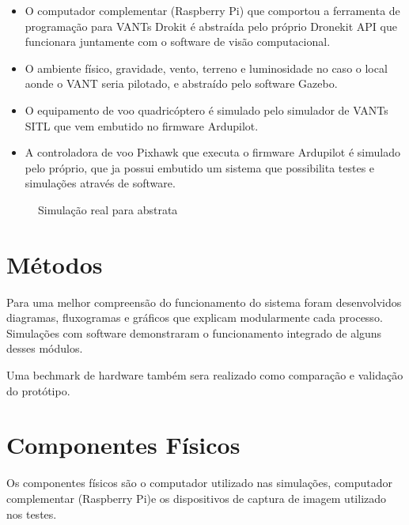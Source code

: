 \begin{itemize}
	\item O computador complementar (Raspberry Pi) que comportou a ferramenta de programação para VANTs Drokit é abstraída pelo próprio Dronekit API que funcionara juntamente com o software de visão computacional.
	\item O ambiente físico, gravidade, vento, terreno e luminosidade no caso o local aonde o VANT seria pilotado, e abstraído pelo software Gazebo. 
	\item O equipamento de voo quadricóptero é simulado pelo simulador de VANTs SITL que vem embutido no firmware Ardupilot.
	\item A controladora de voo Pixhawk que executa o firmware Ardupilot é simulado pelo próprio, que ja possui embutido um sistema que possibilita testes e simulações através de software.  
\end{itemize} 


\begin{figure}[H]
	\centering
	\caption{Simulação real para abstrata}
	\fontsize{9pt}{12pt}\selectfont
	\def\svgwidth{15cm}
	
	\label{fig:simul}
\end{figure}



\section{Métodos}

Para uma melhor compreensão do funcionamento do sistema foram desenvolvidos diagramas, fluxogramas e gráficos que explicam modularmente cada processo. Simulações com software demonstraram o funcionamento integrado de alguns desses módulos. 

Uma bechmark de hardware também sera realizado como comparação e validação do protótipo.


\section{Componentes Físicos}

Os componentes físicos são o computador utilizado nas simulações, computador complementar (Raspberry Pi)e os dispositivos de captura de imagem utilizado nos testes.

